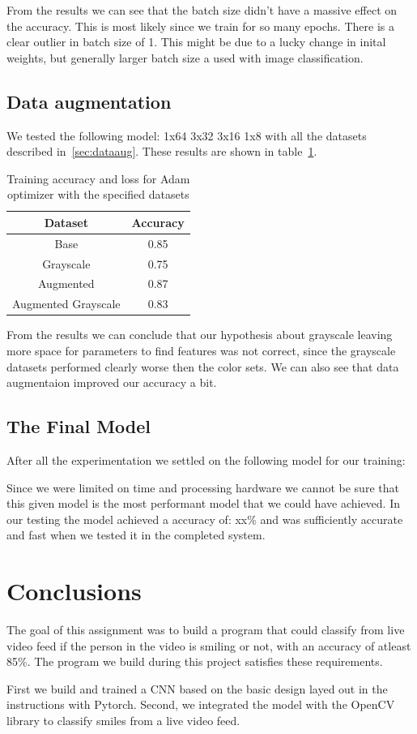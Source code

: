 \documentclass[12pt,a4paper,english
]{tunithesis}
\begin{document}
From the results we can see that the batch size didn't have a massive effect on the accuracy. This is most likely since we train for so many epochs. There is a clear outlier in batch size of 1. This might be due to a lucky change in inital weights, but generally larger batch size a used with image classification.

\section{Data augmentation}
We tested the following model: 1x64 3x32 3x16 1x8 with all the datasets described in~\ref{sec:dataaug}. These results are shown in table~\ref{tab:dataaug}.
\begin{table}[h!]
\centering
\begin{tabular}{|c|c|}
\hline
\textbf{Dataset} & \textbf{Accuracy} \\ \hline
Base & 0.85 \\ \hline
Grayscale & 0.75 \\ \hline
Augmented & 0.87  \\ \hline
Augmented Grayscale & 0.83  \\ \hline
\end{tabular}
\caption{Training accuracy and loss for Adam optimizer with the specified datasets}
\label{tab:dataaug}
\end{table}

From the results we can conclude that our hypothesis about grayscale leaving more space for parameters to find features was not correct, since the grayscale datasets performed clearly worse then the color sets. We can also see that data augmentaion improved our accuracy a bit.

\section{The Final Model}
After all the experimentation we settled on the following model for our training:

Since we were limited on time and processing hardware we cannot be sure that this given model is the most performant model that we could have achieved. In our testing the model achieved a accuracy of: xx\% and was sufficiently accurate and fast when we tested it in the completed system.


\chapter{Conclusions}
\label{ch:conclusions}
The goal of this assignment was to build a program that could classify from live video feed if the person in the video is smiling or not, with an accuracy of atleast 85\%. The program we build during this project satisfies these requirements.

First we build and trained a CNN based on the basic design layed out in the instructions with Pytorch.
Second, we integrated the model with the OpenCV library to classify smiles from a live video feed.

%
%
\newpage

\printbibliography[title=References]
\end{document}
